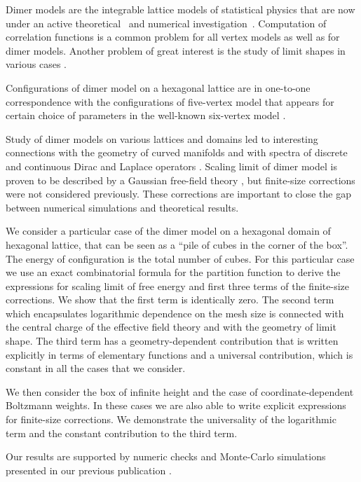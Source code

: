 \documentclass{article}
\begin{document}
Dimer models are the integrable lattice models of statistical physics that are now under an active
theoretical~\cite{zj2000,ferrari} and numerical investigation~\cite{ks2018}. Computation of
correlation functions is a common problem for all vertex models \cite{colomo2012approach} as well as
for dimer models. Another problem of great interest is the study of limit shapes in various cases
\cite{borodin2010q,di2018tangent}.

Configurations of dimer model on a hexagonal lattice are in one-to-one correspondence with the
configurations of five-vertex model that appears for certain choice of parameters in the well-known
six-vertex model \cite{kapitonov2012weighted,kapitonov2008five}.

Study of dimer models on various lattices and domains led to interesting connections with the
geometry of curved manifolds and with spectra of discrete and continuous Dirac and Laplace operators
\cite{kenyon2002laplacian,kenyon2000asymptotic}. Scaling limit of dimer model is proven to be
described by a Gaussian free-field theory \cite{kenyon2001dominos}, but finite-size corrections were
not considered previously. These corrections are important to close the gap between numerical
simulations and theoretical results.

We consider a particular case of the dimer model on a hexagonal domain
of hexagonal lattice, that can be seen as a ``pile of cubes in the
corner of the box''. The energy of configuration is the total number
of cubes. For this particular case we use an exact combinatorial
formula for the partition function to derive the expressions for
scaling limit of free energy and first three terms of the finite-size
corrections. We show that the first term is identically zero. The
second term which encapsulates logarithmic dependence on the mesh size
is connected with the central charge of the effective field theory and
with the geometry of limit shape. The third term has a
geometry-dependent contribution that is written explicitly in terms of
elementary functions and a universal contribution, which is constant
in all the cases that we consider.

We then consider the box of infinite height and the case of
coordinate-dependent Boltzmann weights. In these cases we are also
able to write explicit expressions for finite-size corrections. We
demonstrate the universality of the logarithmic term and the constant
contribution to the third term.

Our results are supported by numeric checks and Monte-Carlo
simulations presented in our previous publication
\cite{1742-6596-1135-1-012024}.
\end{document}
